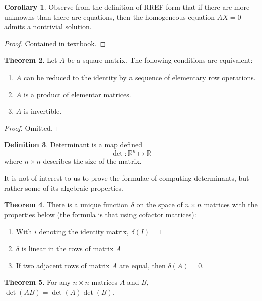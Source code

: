 \documentclass[11pt]{amsart} %
\theoremstyle{definition}
\newtheorem{definition}{Definition}[section]
\newtheorem{theorem}[definition]{Theorem}
\newtheorem{corollary}[definition]{Corollary}
\theoremstyle{definition}
\numberwithin{equation}{section}
\begin{document}
\begin{corollary}
	Observe from the definition of RREF form that if there are more unknowns than there are equations, then the homogeneous equation $AX=0$ admits a nontrivial solution.
\end{corollary}

\begin{proof}
	Contained in textbook.
\end{proof}

\begin{theorem}
	Let $A$ be a square matrix. The following conditions are equivalent:
	\begin{enumerate}[  label=(\alph*)]
		\item $A$ can be reduced to the identity by a sequence of elementary row operations.
		\item $A$ is a product of elementar matrices.
		\item $A$ is invertible.
	\end{enumerate}
\end{theorem}

\begin{proof}
	Omitted.
\end{proof}

\begin{definition}
	Determinant is a map defined
	$$ \det : \mathbb{R}^{n} \mapsto \mathbb{R} $$
	where $n \times n$ describes the size of the matrix.
\end{definition}

It is not of interest to us to prove the formulae of computing determinants, but rather some of its algebraic properties.

\begin{theorem}
	There is a unique function $\delta$ on the space of $n \times n$ matrices with the properties below (the formula is that using cofactor matrices):
	\begin{enumerate}[  label=(\roman*)]
		\item With $i$ denoting the identity matrix, $\delta(I) = 1$
		\item $\delta$ is linear in the rows of matrix $A$
		\item If two adjacent rows of matrix $A$ are equal, then $\delta(A) = 0$.
	\end{enumerate}
\end{theorem}

\begin{theorem}
	For any $n \times n$ matrices $A$ and $B$, $\det(AB) = \det(A) \det(B)$.
\end{theorem}
\end{document}
